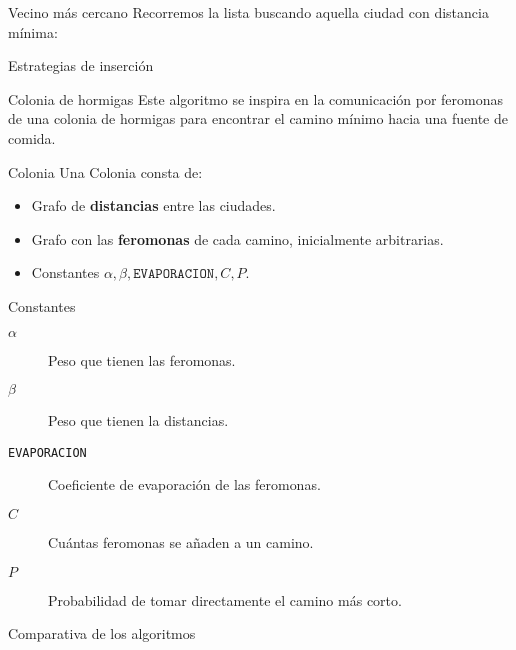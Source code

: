 \begin{frame}[fragile]{Vecino más cercano}
\vspace*{-.5cm}
Recorremos la lista buscando aquella ciudad con distancia mínima:

\end{frame}

\begin{frame}{Estrategias de inserción}
\end{frame}

\begin{frame}{Colonia de hormigas}
Este algoritmo se inspira en la comunicación por feromonas
de una colonia de hormigas para encontrar el camino mínimo hacia una fuente de comida.
\end{frame}

\begin{frame}{Colonia}
Una Colonia consta de:
\begin{itemize}
  \item Grafo de \textbf{distancias} entre las ciudades.
  \item Grafo con las \textbf{feromonas} de cada camino, inicialmente arbitrarias.
  \item Constantes $\alpha, \beta, \texttt{EVAPORACION}, C, P$.
\end{itemize}
\end{frame}

\begin{frame}{Constantes}
\begin{description}
  \item[$\alpha$] Peso que tienen las feromonas.
  \item[$\beta$] Peso que tienen la distancias.
  \item[\texttt{EVAPORACION}] Coeficiente de evaporación de las feromonas.
  \item[$C$] Cuántas feromonas se añaden a un camino.
  \item[$P$] Probabilidad de tomar directamente el camino más corto.
\end{description}
\end{frame}

\begin{frame}{Comparativa de los algoritmos}
\end{frame}
